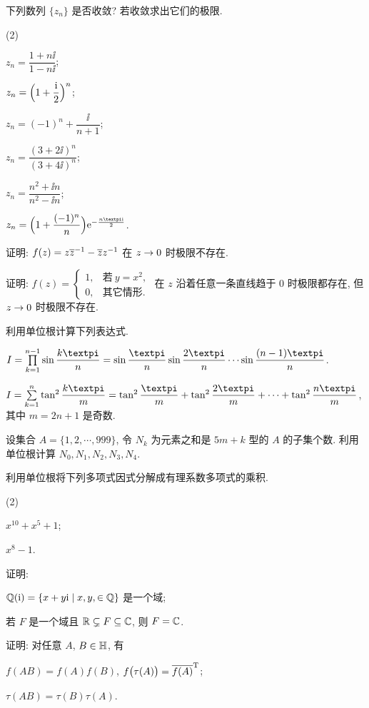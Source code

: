 \begin{homework}
\begin{homework}
    \item 下列数列 $\{z_n\}$ 是否收敛? 若收敛求出它们的极限.
    \begin{subhomework}[after-item-skip=2pt](2)
      \item $z_n=\dfrac{1+n\ii}{1-n\ii}$;
      \item $z_n=\Bigl(1+\dfrac {\mathrm{i}}2\Bigr)^n$;
      \item $z_n=(-1)^n+\dfrac{\ii}{n+1}$;
      \item $z_n=\dfrac{(3+2\ii)^n}{(3+4\ii)^n}$;
      \item $z_n=\dfrac{n^2+\ii n}{n^2-\ii n}$;
      \item $z_n=\Bigl(1+\dfrac{(-1)^n}n\Bigr)\ee^{-\frac{n\cpi \ii}2}$.
    \end{subhomework}
    \item 证明: $f(z)=z{\overline z}^{-1}-\overline zz^{-1}$ 在 $z\rightarrow 0$ 时极限不存在.
    \item 证明: $f(z)=\begin{cases}
      1,&\text{若}\ y=x^2,\\
      0,&\text{其它情形}.
    \end{cases}$ 在 $z$ 沿着任意一条直线趋于 $0$ 时极限都存在, 但 $z\rightarrow0$ 时极限不存在.
    \item \optionalex 利用单位根计算下列表达式.
      \begin{subhomework}
        \item $I=\prod\limits_{k=1}^{n-1}\sin\dfrac{k\cpi}n=\sin\dfrac{\cpi}n\sin\dfrac{2\cpi}n \cdots \sin\dfrac{(n-1)\cpi}n$.
        \item $I=\sum\limits_{k=1}^n\tan^2\dfrac{k\cpi}m=\tan^2\dfrac{\cpi}m+\tan^2\dfrac{2\cpi}m+\cdots+\tan^2\dfrac{n\cpi}m$, 其中 $m=2n+1$ 是奇数.
      \end{subhomework} 
    \item \optionalex 设集合 $A=\{1,2,\cdots,999\}$, 令 $N_k$ 为元素之和是 $5m+k$ 型的 $A$ 的子集个数. 利用单位根计算 $N_0,N_1,N_2,N_3,N_4$.
    \item \optionalex 利用单位根将下列多项式因式分解成有理系数多项式的乘积.
      \begin{subhomework}(2)
        \item $x^{10}+x^5+1$;
        \item $x^8-1$.
      \end{subhomework}
    \item \optionalex 证明: 
      \begin{subhomework}
        \item ${\mathbb{Q}}(\mathrm{i})=\{x+y\mathrm{i}\mid x,y,\in{\mathbb{Q}}\}$ 是一个域;
        \item 若 $F$ 是一个域且 ${\mathbb{R}}\subsetneq F\subseteq {\mathbb{C}}$, 则 $F={\mathbb{C}}$.
      \end{subhomework}
    \item \optionalex 证明: 对任意 $A$, $B\in{\mathbb{H}}$, 有
    \begin{subhomework}
      \item $f(AB)=f(A)f(B)$, $f\bigl(\tau(A)\bigr)=\overline{f(A)}^{{\mathrm{T}}}$;
      \item $\tau(AB)=\tau(B)\tau(A)$.
    \end{subhomework}
  \end{homework}
\end{homework}
